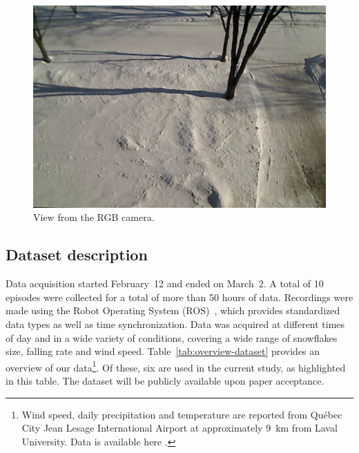 \begin{figure}[h]
    \centering
    \includegraphics[width=0.90\linewidth]{./img/chap_lidar/camera_view.jpg}
    \caption{View from the RGB camera.}
    \label{fig:view}
\end{figure}

\subsection{Dataset description}
Data acquisition started February~12 and ended on March~2. A total of 10 episodes were collected for a total of more than 50 hours of data. Recordings were made using the Robot Operating System (ROS)~\cite{ROSWeb}, which provides standardized data types as well as time synchronization. Data was acquired at different times of day and in a wide variety of conditions, covering a wide range of snowflakes size, falling rate and wind speed.  Table~\ref{tab:overview-dataset} provides an overview of our data\footnote{Wind speed, daily precipitation and temperature are reported from Québec City Jean Lesage International Airport at approximately \SI{9}{\km} from Laval University. Data is available here \cite{WeatherCanada}.}. Of these, six are used in the current study, as highlighted in this table. The dataset will be publicly available upon paper acceptance. %

